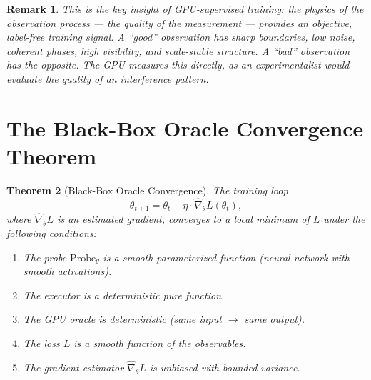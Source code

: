 \documentclass[11pt,twocolumn,a4paper]{article}
\newtheorem{theorem}{Theorem}[section]
\newtheorem{remark}[theorem]{Remark}
\begin{document}
\begin{remark}
This is the key insight of GPU-supervised training: the physics of
the observation process --- the quality of the measurement --- provides
an objective, label-free training signal. A ``good'' observation has
sharp boundaries, low noise, coherent phases, high visibility, and
scale-stable structure. A ``bad'' observation has the opposite. The
GPU measures this directly, as an experimentalist would evaluate the
quality of an interference pattern.
\end{remark}


\section{The Black-Box Oracle Convergence Theorem}
\label{sec:convergence}

\begin{theorem}[Black-Box Oracle Convergence]
\label{thm:convergence}
The training loop
\begin{equation}
\theta_{t+1} = \theta_t
  - \eta \cdot \hat{\nabla}_\theta L(\theta_t),
\label{eq:update}
\end{equation}
where $\hat{\nabla}_\theta L$ is an estimated gradient, converges to
a local minimum of $L$ under the following conditions:
\begin{enumerate}[label=(\roman*),leftmargin=*]
\item The probe $\mathrm{Probe}_\theta$ is a smooth parameterized
  function (neural network with smooth activations).
\item The executor is a deterministic pure function.
\item The GPU oracle is deterministic (same input $\to$ same output).
\item The loss $L$ is a smooth function of the observables.
\item The gradient estimator $\hat{\nabla}_\theta L$ is unbiased
  with bounded variance.
\end{enumerate}
\end{theorem}
\end{document}
